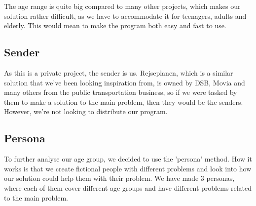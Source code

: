 The age range is quite big compared to many other projects, which makes our solution rather difficult, as we have to accommodate it for teenagers, adults and elderly. This would mean to make the program both easy and fast to use. 

\subsection{Sender} %

As this is a private project, the sender is us. Rejseplanen, which is a similar solution that we've been looking inspiration from, is owned by DSB, Movia and many others from the public transportation business\cite{om_rejseplanen}, so if we were tasked by them to make a solution to the main problem, then they would be the senders. However, we're not looking to distribute our program.

\subsection{Persona}

To further analyse our age group, we decided to use the 'persona' method. How it works is that we create fictional people with different problems and look into how our solution could help them  with their problem. We have made 3 personas, where each of them cover different age groups and have different problems related to the main problem. 


